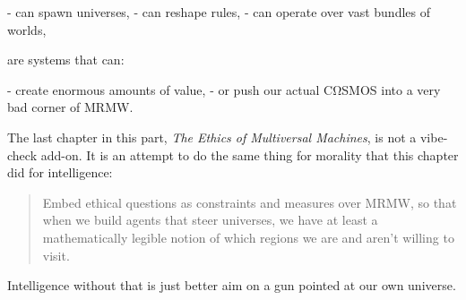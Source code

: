 - can spawn universes,
- can reshape rules,
- can operate over vast bundles of worlds,

are systems that can:

- create enormous amounts of value,
- or push our actual CΩSMOS into a very bad corner of MRMW.

The last chapter in this part, \emph{The Ethics of Multiversal Machines}, is not a vibe-check add-on. It is an attempt to do the same thing for morality that this chapter did for intelligence:

\begin{quote}
Embed ethical questions as constraints and measures over MRMW, so that when we build agents that steer universes, we have at least a mathematically legible notion of which regions we are and aren’t willing to visit.  
\end{quote}

Intelligence without that is just better aim on a gun pointed at our own universe.
